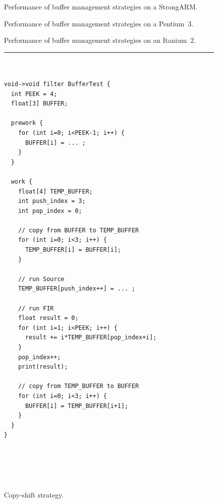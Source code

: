 \documentclass{sigplanconf}
\begin{document}
\begin{figure}[t]
\vspace{-3pt}
\nocaptionrule
\begin{minipage}{2.2in}
\hspace{-0.1in}
\caption{Performance of buffer management strategies on a StrongARM.\protect\label{fig:buf-arm}}
\end{minipage}
\hspace{0.1in}
\begin{minipage}{2.2in}
\hspace{-0.1in}
\caption{Performance of buffer management strategies on a Pentium~3.\protect\label{fig:buf-p3}}
\end{minipage}
\hspace{0.1in}
\begin{minipage}{2.2in}
\hspace{-0.1in}
\caption{Performance of buffer management strategies on an Itanium~2.\protect\label{fig:buf-i2}}
\end{minipage}
\vspace{18pt}
\hrule
\begin{minipage}[t]{2.25in}
{\FusionFig
\begin{verbatim}


void->void filter BufferTest {
  int PEEK = 4;
  float[3] BUFFER;

  prework {
    for (int i=0; i<PEEK-1; i++) {
      BUFFER[i] = ... ;
    }
  }

  work {
    float[4] TEMP_BUFFER;
    int push_index = 3;
    int pop_index = 0;

    // copy from BUFFER to TEMP_BUFFER
    for (int i=0; i<3; i++) {
      TEMP_BUFFER[i] = BUFFER[i];
    }

    // run Source
    TEMP_BUFFER[push_index++] = ... ;
    
    // run FIR
    float result = 0;
    for (int i=1; i<PEEK; i++) {
      result += i*TEMP_BUFFER[pop_index+i];
    }
    pop_index++;
    print(result);

    // copy from TEMP_BUFFER to BUFFER
    for (int i=0; i<3; i++) {
      BUFFER[i] = TEMP_BUFFER[i+1];
    }
  }
}
\end{verbatim}}

\caption{Copy-shift strategy.\protect\label{fig:copy-shift}}
\end{minipage}
~~\vrule~~
\begin{minipage}[t]{2in}
{\FusionFig
\begin{verbatim}



\end{verbatim}}
\end{minipage}
\end{figure}
\end{document}
